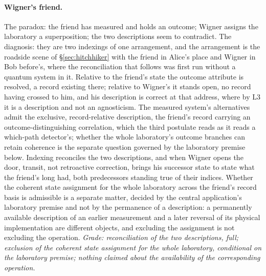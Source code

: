 \paragraph{Wigner's friend.} The paradox: the friend has measured and holds an outcome; Wigner assigns the laboratory a superposition; the two descriptions seem to contradict. The diagnosis: they are two indexings of one arrangement, and the arrangement is the roadside scene of \S\ref{sec:hitchhiker} with the friend in Alice's place and Wigner in Bob before's, where the reconciliation that follows was first run without a quantum system in it. Relative to the friend's state the outcome attribute is resolved, a record existing there; relative to Wigner's it stands open, no record having crossed to him, and his description is correct at that address, where by L3 it is a description and not an agnosticism. The measured system's alternatives admit the exclusive, record-relative description, the friend's record carrying an outcome-distinguishing correlation, which the third postulate reads as it reads a which-path detector's; whether the whole laboratory's outcome branches can retain coherence is the separate question governed by the laboratory premise below. Indexing reconciles the two descriptions, and when Wigner opens the door, transit, not retroactive correction, brings his successor state to state what the friend's long had, both predecessors standing true of their indices. Whether the coherent state assignment for the whole laboratory across the friend's record basis is admissible is a separate matter, decided by the central application's laboratory premise and not by the permanence of a description: a permanently available description of an earlier measurement and a later reversal of its physical implementation are different objects, and excluding the assignment is not excluding the operation. \emph{Grade: reconciliation of the two descriptions, full; exclusion of the coherent state assignment for the whole laboratory, conditional on the laboratory premise; nothing claimed about the availability of the corresponding operation.}
